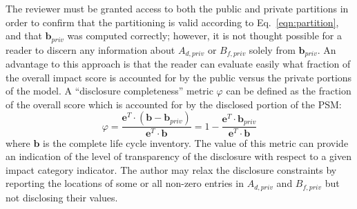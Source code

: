The reviewer must be granted access to both the public and private partitions in order to confirm that the partitioning is valid according to Eq.~\ref{eqn:partition}, and that $\mathbf{b}_{priv}$ was computed correctly; however, it is not thought possible for a reader to discern any information about $A_{d,priv}$ or $B_{f,priv}$ solely from $\mathbf{b}_{priv}$.  An advantage to this approach is that the reader can evaluate easily what fraction of the overall impact score is accounted for by the public versus the private portions of the model.  A ``disclosure completeness'' metric $\varphi$ can be defined as the fraction of the overall score which is accounted for by the disclosed portion of the PSM:
\begin{equation}
  \varphi =  \frac{\mathbf{e}^T\cdot(\mathbf{b} - \mathbf{b}_{priv})}{\mathbf{e}^T\cdot\mathbf{b}} = 1 - \frac{\mathbf{e}^T\cdot\mathbf{b}_{priv}}{\mathbf{e}^T\cdot\mathbf{b}}
  \label{eqn:metric}
\end{equation}
where $\mathbf{b}$ is the complete life cycle inventory.  The value of this metric can provide an indication of the level of transparency of the disclosure with respect to a given impact category indicator.  The author may relax the disclosure constraints by reporting the locations of some or all non-zero entries in $A_{d,priv}$ and $B_{f,priv}$ but not disclosing their values.

